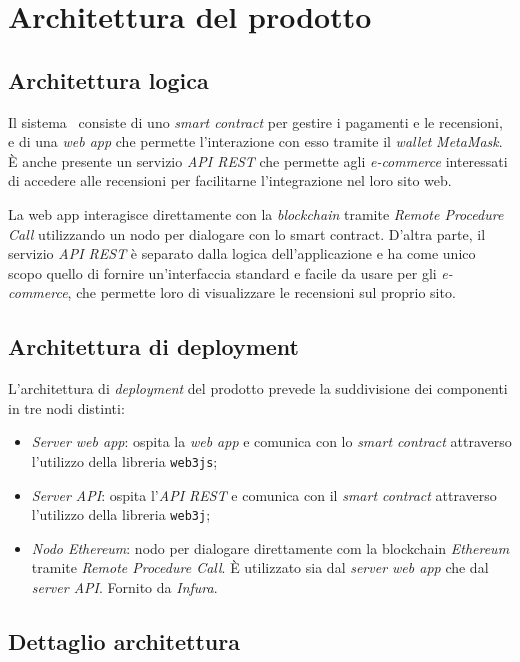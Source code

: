 \section{Architettura del prodotto}

\subsection{Architettura logica}
Il sistema \capName\ consiste di uno \textit{smart contract} per gestire i pagamenti e le recensioni, e di una \textit{web app} che permette l'interazione con esso tramite il \textit{wallet} \textit{MetaMask}. È anche presente un servizio \textit{API REST} che permette agli \textit{e-commerce} interessati di accedere alle recensioni per facilitarne l'integrazione nel loro sito web.

La web app interagisce direttamente con la \textit{blockchain} tramite \textit{Remote Procedure Call} utilizzando un nodo per dialogare con lo smart contract. D'altra parte, il servizio \textit{API REST} è separato dalla logica dell'applicazione e ha come unico scopo quello di fornire un'interfaccia standard e facile da usare per gli \textit{e-commerce}, che permette loro di visualizzare le recensioni sul proprio sito.

\subsection{Architettura di deployment}
L'architettura di \textit{deployment} del prodotto prevede la suddivisione dei componenti in tre nodi distinti:
\begin{itemize}
    \item \textit{Server web app}: ospita la \textit{web app} e comunica con lo \textit{smart contract} attraverso l'utilizzo della libreria \texttt{web3js};
    \item \textit{Server API}: ospita l'\textit{API REST} e comunica con il \textit{smart contract} attraverso l'utilizzo della libreria \texttt{web3j};
    \item \textit{Nodo Ethereum}: nodo per dialogare direttamente com la blockchain \textit{Ethereum} tramite \textit{Remote Procedure Call}. È utilizzato sia dal \textit{server web app} che dal \textit{server API}. Fornito da \textit{Infura}.
\end{itemize}
\pagebreak

\subsection{Dettaglio architettura}
